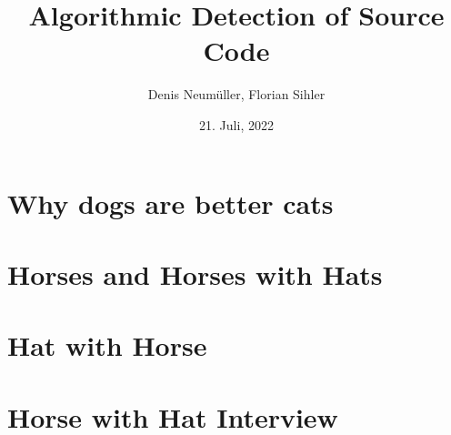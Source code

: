 \documentclass[a3paper, protrait, ngerman]{uulm-cs-poster}
\title{Algorithmic Detection of Source Code}
\author{Denis Neumüller, Florian Sihler}
\date{21. Juli, 2022}
\begin{document}
\maketitle
\section*{Why dogs are better cats}
\lipsum[2]
\begin{multicols}{3}
\section*{Horses and Horses with Hats}
   \lipsum[1-4]
\section*{Hat with Horse}
   \lipsum[4-7]
\end{multicols}
\lipsum[2]
\section*{Horse with Hat Interview}
\begin{multicols}{4}
   \lipsum[2]
\end{multicols}
\end{document}
